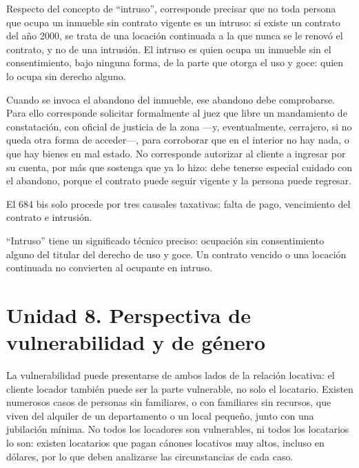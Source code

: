 \documentclass[12pt,oneside]{book}
\begin{document}
Respecto del concepto de ``intruso'', corresponde precisar que no toda persona que ocupa un inmueble sin contrato vigente es un intruso: si existe un contrato del año 2000, se trata de una locación continuada a la que nunca se le renovó el contrato, y no de una intrusión. El intruso es quien ocupa un inmueble sin el consentimiento, bajo ninguna forma, de la parte que otorga el uso y goce: quien lo ocupa sin derecho alguno.

Cuando se invoca el abandono del inmueble, ese abandono debe comprobarse. Para ello corresponde solicitar formalmente al juez que libre un mandamiento de constatación, con oficial de justicia de la zona ---y, eventualmente, cerrajero, si no queda otra forma de acceder---, para corroborar que en el interior no hay nada, o que hay bienes en mal estado. No corresponde autorizar al cliente a ingresar por su cuenta, por más que sostenga que ya lo hizo: debe tenerse especial cuidado con el abandono, porque el contrato puede seguir vigente y la persona puede regresar.

\begin{important}
El 684 bis solo procede por tres causales taxativas: falta de pago, vencimiento del contrato e intrusión.

``Intruso'' tiene un significado técnico preciso: ocupación sin consentimiento alguno del titular del derecho de uso y goce. Un contrato vencido o una locación continuada no convierten al ocupante en intruso.
\end{important}

\section{Unidad 8. Perspectiva de vulnerabilidad y de género}

La vulnerabilidad puede presentarse de ambos lados de la relación locativa: el cliente locador también puede ser la parte vulnerable, no solo el locatario. Existen numerosos casos de personas sin familiares, o con familiares sin recursos, que viven del alquiler de un departamento o un local pequeño, junto con una jubilación mínima. No todos los locadores son vulnerables, ni todos los locatarios lo son: existen locatarios que pagan cánones locativos muy altos, incluso en dólares, por lo que deben analizarse las circunstancias de cada caso.
\end{document}
